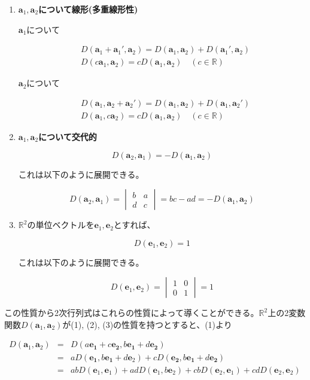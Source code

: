 \documentclass[dvipdfmx,autodetect-engine]{jsarticle}
\newcommand{\vecSpace}[1]{\mathbb{R}^{#1}}
\begin{document}
\begin{enumerate}
\renewcommand{\labelenumi}{(\arabic{enumi})}
\item {\bf $\bm{a}_1, \bm{a}_2$について線形(多重線形性)}

$\bm{a}_1$について

\begin{eqnarray*}
&D(\bm{a}_1 + \bm{a}_1', \bm{a}_2) = D(\bm{a}_1, \bm{a}_2) + D(\bm{a}_1',  \bm{a}_2) \\
&D(c\bm{a}_1, \bm{a}_2) = cD(\bm{a}_1, \bm{a}_2) \quad (c \in \mathbb{R})
\end{eqnarray*}

$\bm{a}_2$について

\begin{eqnarray*}
&D(\bm{a}_1, \bm{a}_2 + \bm{a}_2') = D(\bm{a}_1, \bm{a}_2) + D(\bm{a}_1,  \bm{a}_2') \\
&D(\bm{a}_1, c\bm{a}_2) = cD(\bm{a}_1, \bm{a}_2) \quad (c \in \mathbb{R})
\end{eqnarray*}


\item {\bf $\bm{a}_1, \bm{a}_2$について交代的}

$$
D(\bm{a}_2, \bm{a}_1) = -D(\bm{a}_1, \bm{a}_2)
$$

これは以下のように展開できる。

$$
D(\bm{a}_2, \bm{a}_1) = \begin{vmatrix}
b & a \\
d & c
\end{vmatrix} = bc - ad = -D(\bm{a}_1, \bm{a}_2)
$$

\item $\vecSpace{2}$の単位ベクトルを$\bm{e}_1, \bm{e}_2$とすれば、

$$
D(\bm{e}_1, \bm{e}_2) = 1
$$

これは以下のように展開できる。

$$
D(\bm{e}_1, \bm{e}_2) = \begin{vmatrix}
1 & 0 \\
0 & 1
\end{vmatrix} = 1
$$

\end{enumerate}

この性質から2次行列式はこれらの性質によって導くことができる。$\vecSpace{2}$上の2変数関数$D(\bm{a}_1, \bm{a}_2)$が(1), (2), (3)の性質を持つとすると、(1)より

\begin{eqnarray*}
D(\bm{a}_1, \bm{a}_2) &= &D(a\bm{e_1} + c\bm{e_2}, b\bm{e_1} + d\bm{e_2}) \\
&= &aD(\bm{e_1}, b\bm{e_1} + d \bm{e}_2) + cD(\bm{e_2}, b\bm{e_1} + d\bm{e_2}) \\
&= &abD(\bm{e}_1, \bm{e}_1) + adD(\bm{e}_1, b\bm{e}_2) + cbD(\bm{e}_2, \bm{e}_1) + cdD(\bm{e}_2, \bm{e}_2)
\end{eqnarray*}
\end{document}
